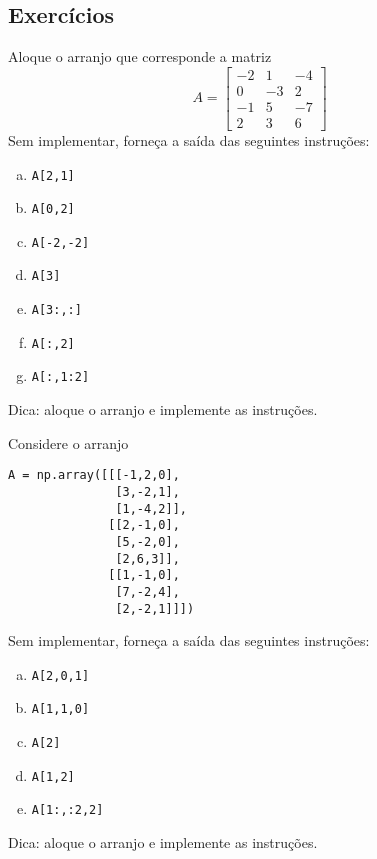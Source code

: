 \subsection{Exercícios}

\begin{exer}
  Aloque o arranjo que corresponde a matriz
  \begin{equation}
    A =
    \begin{bmatrix}
      -2 & 1 & -4\\
      0  & -3 & 2\\
      -1 & 5 & -7\\
      2 & 3 & 6
    \end{bmatrix}
  \end{equation}
  Sem implementar, forneça a saída das seguintes instruções:
  \begin{enumerate}[a)]
  \item \lstinline+A[2,1]+
  \item \lstinline+A[0,2]+
  \item \lstinline+A[-2,-2]+
  \item \lstinline+A[3]+
  \item \lstinline+A[3:,:]+
  \item \lstinline+A[:,2]+
  \item \lstinline+A[:,1:2]+
  \end{enumerate}
\end{exer}
\begin{resp}
  Dica: aloque o arranjo e implemente as instruções.
\end{resp}

\begin{exer}
  Considere o arranjo
\begin{lstlisting}
A = np.array([[[-1,2,0],
               [3,-2,1],
               [1,-4,2]],
              [[2,-1,0],
               [5,-2,0],
               [2,6,3]],
              [[1,-1,0],
               [7,-2,4],
               [2,-2,1]]])
\end{lstlisting}
  Sem implementar, forneça a saída das seguintes instruções:
  \begin{enumerate}[a)]
  \item \lstinline+A[2,0,1]+
  \item \lstinline+A[1,1,0]+
  \item \lstinline+A[2]+
  \item \lstinline+A[1,2]+
  \item \lstinline+A[1:,:2,2]+
  \end{enumerate}
\end{exer}
\begin{resp}
  Dica: aloque o arranjo e implemente as instruções.
\end{resp}

